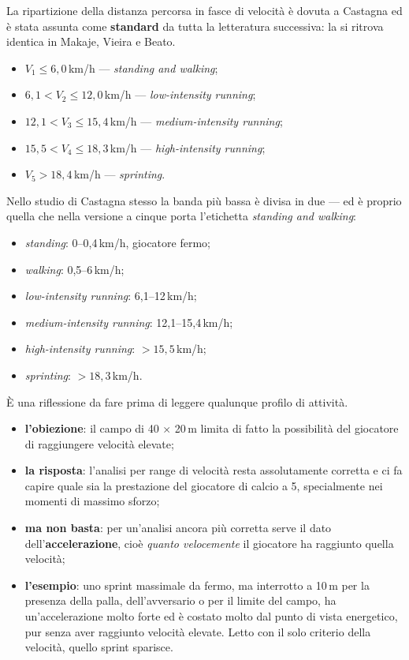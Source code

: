 La ripartizione della distanza percorsa in fasce di velocità è dovuta a Castagna ed è stata assunta
come \textbf{standard} da tutta la letteratura successiva: la si ritrova identica in Makaje, Vieira
e Beato.

\begin{itemize}
  \item $V_1 \leq 6{,}0$\,km/h --- \textit{standing and walking};
  \item $6{,}1 < V_2 \leq 12{,}0$\,km/h --- \textit{low-intensity running};
  \item $12{,}1 < V_3 \leq 15{,}4$\,km/h --- \textit{medium-intensity running};
  \item $15{,}5 < V_4 \leq 18{,}3$\,km/h --- \textit{high-intensity running};
  \item $V_5 > 18{,}4$\,km/h --- \textit{sprinting}.
\end{itemize}

Nello studio di Castagna stesso la banda più bassa è divisa in due --- ed è proprio quella che nella
versione a cinque porta l'etichetta \textit{standing and walking}:
\begin{itemize}
  \item \textit{standing}: 0--0,4\,km/h, giocatore fermo;
  \item \textit{walking}: 0,5--6\,km/h;
  \item \textit{low-intensity running}: 6,1--12\,km/h;
  \item \textit{medium-intensity running}: 12,1--15,4\,km/h;
  \item \textit{high-intensity running}: $> 15{,}5$\,km/h;
  \item \textit{sprinting}: $> 18{,}3$\,km/h.
\end{itemize}

È una riflessione da fare prima di leggere qualunque profilo di attività.
\begin{itemize}
  \item \textbf{l'obiezione}: il campo di 40 $\times$ 20\,m limita di fatto la possibilità del
    giocatore di raggiungere velocità elevate;
  \item \textbf{la risposta}: l'analisi per range di velocità resta assolutamente corretta e ci fa
    capire quale sia la prestazione del giocatore di calcio a 5, specialmente nei momenti di massimo
    sforzo;
  \item \textbf{ma non basta}: per un'analisi ancora più corretta serve il dato
    dell'\textbf{accelerazione}, cioè \textit{quanto velocemente} il giocatore ha raggiunto quella
    velocità;
  \item \textbf{l'esempio}: uno sprint massimale da fermo, ma interrotto a 10\,m per la presenza
    della palla, dell'avversario o per il limite del campo, ha un'accelerazione molto forte ed è
    costato molto dal punto di vista energetico, pur senza aver raggiunto velocità elevate. Letto
    con il solo criterio della velocità, quello sprint sparisce.
\end{itemize}

